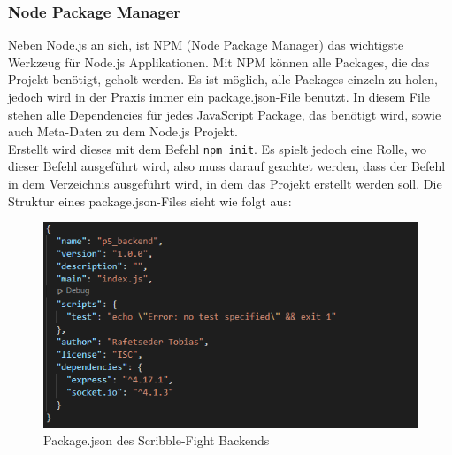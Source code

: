 


\subsubsection{Node Package Manager}\label{NPM}
Neben Node.js an sich, ist NPM (Node Package Manager) das wichtigste Werkzeug für Node.js Applikationen. Mit NPM können alle Packages, die das Projekt benötigt, geholt werden.
Es ist möglich, alle Packages einzeln zu holen, jedoch wird in der Praxis immer ein package.json-File benutzt. In diesem File stehen alle Dependencies für jedes JavaScript Package,
das benötigt wird, sowie auch Meta-Daten zu dem Node.js Projekt. \cite{node_environment}  \\
Erstellt wird dieses mit dem Befehl \texttt{npm init}. Es spielt jedoch eine Rolle, wo dieser Befehl ausgeführt wird, also muss darauf geachtet werden, dass der Befehl in dem Verzeichnis ausgeführt wird, in dem das Projekt erstellt werden soll.
Die Struktur eines package.json-Files sieht wie folgt aus:
\begin{figure}[H]
    \centering
    \includegraphics[scale=1]{pics/package json.PNG}
    \caption{Package.json des Scribble-Fight Backends}
\end{figure}


